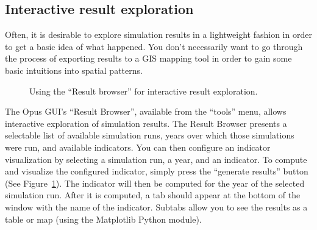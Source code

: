 \subsection{Interactive result exploration}\label{sec:interactive-result-exploration}
\label{sec:interactive-result-exploration}
Often, it is desirable to explore simulation results in a lightweight
fashion in order to get a basic idea of what happened. You don't
necessarily want to go through the process of exporting results to a
GIS mapping tool in order to gain some basic intuitions into spatial
patterns.

\begin{figure}[tp]
\begin{center}
\end{center}
\caption{Using the ``Result browser'' for interactive result
exploration.}
\label{fig:results-manager-result-browser}
\end{figure}


The Opus GUI's ``Result Browser'', available from the ``tools''
menu, allows interactive exploration of simulation results. The Result
Browser presents a selectable list of available simulation runs, years
over which those simulations were run, and available indicators. You
can then configure an indicator visualization by selecting a simulation
run, a year, and an indicator. To compute and visualize the configured
indicator, simply press the ``generate results'' button (See
Figure~\ref{fig:results-manager-result-browser}). The
indicator will then be computed for the year of the selected simulation
run. After it is computed, a tab should appear at the bottom of the
window with the name of the indicator. Subtabs allow you to see the
results as a table or map (using the Matplotlib Python module). 


